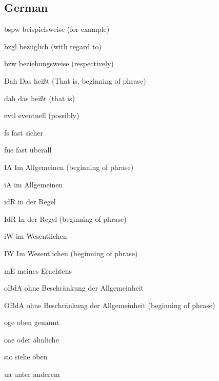 \documentclass[english,a4paper,DIV=12,parskip=full,oneside]{scrartcl}
\begin{document}
        \subsection{German}
            \begin{commandlist}
                \item[bspw] beispielsweise (for example) \codeExample{\bspw}
                \item[bzgl] bezüglich (with regard to) \codeExample{\bzgl}
                \item[bzw] beziehungsweise (respectively) \codeExample{\bzw}
                \item[Dah] Das heißt (That is, beginning of phrase) \codeExample{\Dah}
                \item[dah] das heißt (that is) \codeExample{\dah}
                \item[evtl] eventuell (possibly) \codeExample{\evtl}
                \item[fs] fast sicher \codeExample{\fs}
                \item[fue] fast überall \codeExample{\fue}
                \item[IA] Im Allgemeinen (beginning of phrase) \codeExample{\IA}
                \item[iA] im Allgemeinen \codeExample{\iA}
                \item[idR] in der Regel \codeExample{\idR}
                \item[IdR] In der Regel (beginning of phrase) \codeExample{\IdR}
                \item[iW] im Wesentlichen \codeExample{\iW}
                \item[IW] Im Wesentlichen (beginning of phrase) \codeExample{\IW}
                \item[mE] meines Erachtens \codeExample{\mE}
                \item[oBdA] ohne Beschränkung der Allgemeinheit \codeExample{\oBdA}
                \item[OBdA] ohne Beschränkung der Allgemeinheit (beginning of phrase) \par\codeExample{\OBdA}
                \item[oge] oben genannt \codeExample{\oge}
                \item[oae] oder ähnliche \codeExample{\oae}
                \item[sio] siehe oben \codeExample{\sio}
                \item[ua] unter anderem \codeExample{\ua}

\end{commandlist}
\end{document}
